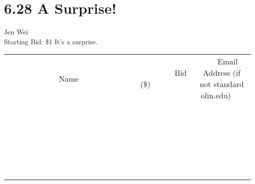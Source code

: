 \documentclass[11pt]{article}
\begin{document}
\section*{6.28 A Surprise!}
Jen Wei
\\
Starting Bid: \$1
\newline
It's a surprise.
\\[6ex]
\begin{tabular}{c c c}
~~~~~~~~~~~~~Name~~~~~~~~~~~~~ & ~~~~~~~~~Bid (\$)~~~~~~~~~  & ~~~Email Address (if not standard olin.edu)~~~\\
 & & \\
\hline
 & & \\
\hline
 & & \\
\hline
 & & \\
\hline
 & & \\
\hline
 & & \\
\hline
 & & \\
\hline
 & & \\
\hline
 & & \\
\hline
 & & \\
\hline
 & & \\
\hline
 & & \\
\hline
 & & \\
\hline
 & & \\
\hline
 & & \\
\hline
 & & \\
\hline
 & & \\
\hline
 & & \\
\hline
 & & \\
\hline
 & & \\
\hline
 & & \\
\hline
 & & \\
\hline
 & & \\
\hline
 & & \\
\hline
 & & \\
\hline
 & & \\
\hline
\end{tabular}
\newpage
\end{document}
